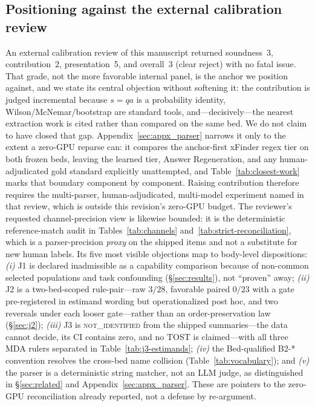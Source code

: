 \documentclass{article}
\begin{document}
\subsection{Positioning against the external calibration review}
An external calibration review of this manuscript returned soundness~3,
contribution~2, presentation~5, and overall~3 (clear reject) with no fatal
issue.  That grade, not the more favorable internal panel, is the anchor we
position against, and we state its central objection without softening it: the
contribution is judged incremental because $s=qa$ is a probability identity,
Wilson/McNemar/bootstrap are standard tools, and---decisively---the nearest
extraction work is cited rather than compared on the same bed.  We do not claim
to have closed that gap.  Appendix~\ref{sec:appx_parser} narrows it only to the
extent a zero-GPU reparse can: it compares the anchor-first xFinder regex tier
on both frozen beds, leaving the learned tier, Answer Regeneration, and any
human-adjudicated gold standard explicitly unattempted, and
Table~\ref{tab:closest-work} marks that boundary component by component.
Raising contribution therefore requires the multi-parser, human-adjudicated,
multi-model experiment named in that review, which is outside this revision's
zero-GPU budget.  The reviewer's requested channel-precision
view is likewise bounded: it is the deterministic reference-match audit in
Tables~\ref{tab:channels} and~\ref{tab:strict-reconciliation}, which is a
parser-precision \emph{proxy} on the shipped items and not a substitute for new
human labels.  Its five most visible objections map to body-level
dispositions: \emph{(i)} J1 is declared inadmissible as a capability comparison
because of non-common selected populations and task confounding
(\S\ref{sec:results}), not ``proven'' away; \emph{(ii)} J2 is a two-bed-scoped
rule-pair---raw $3/28$, favorable paired $0/23$ with a gate pre-registered in
estimand wording but operationalized post hoc, and two reversals under each
looser gate---rather than an order-preservation law (\S\ref{sec:j2});
\emph{(iii)} J3 is \textsc{not\_identified} from the shipped summaries---the
data cannot decide, its CI contains zero, and no TOST is claimed---with all
three MDA rulers separated in Table~\ref{tab:j3-estimands}; \emph{(iv)} the
Bed-qualified \textsc{B2-*} convention resolves the cross-bed name collision
(Table~\ref{tab:vocabulary}); and \emph{(v)} the parser is a deterministic
string matcher, not an LLM judge, as distinguished in \S\ref{sec:related} and
Appendix~\ref{sec:appx_parser}.  These are pointers to the zero-GPU
reconciliation already reported, not a defense by re-argument.
\end{document}
